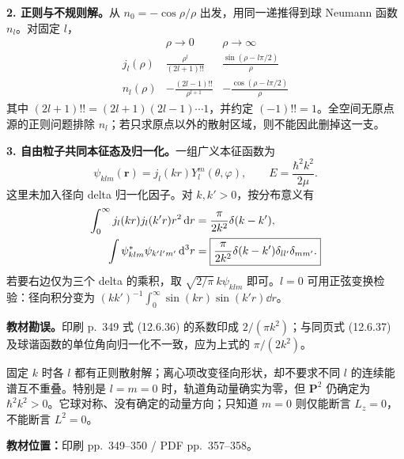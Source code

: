 \textbf{2. 正则与不规则解。}从 $n_0=-\cos\rho/\rho$ 出发，用同一递推得到球 Neumann 函数 $n_l$。对固定 $l$，
\begin{equation}
  \begin{array}{c|cc}
    &\rho\to0&\rho\to\infty\\ \hline
    j_l(\rho)&\displaystyle\frac{\rho^l}{(2l+1)!!}
       &\displaystyle\frac{\sin(\rho-l\pi/2)}\rho\\[6pt]
    n_l(\rho)&\displaystyle-\frac{(2l-1)!!}{\rho^{l+1}}
       &\displaystyle-\frac{\cos(\rho-l\pi/2)}\rho
  \end{array}
\end{equation}
其中 $(2l+1)!!=(2l+1)(2l-1)\cdots1$，并约定 $(-1)!!=1$。全空间无原点源的正则问题排除 $n_l$；若只求原点以外的散射区域，则不能因此删掉这一支。

\textbf{3. 自由粒子共同本征态及归一化。}一组广义本征函数为
\begin{equation}
  \boxed{\psi_{klm}(\mathbf r)=j_l(kr)Y_l^m(\theta,\varphi),\qquad
    E=\frac{\hbar^2k^2}{2\mu}.}
\end{equation}
这里未加入径向 delta 归一化因子。对 $k,k'>0$，按分布意义有
\begin{align}
  \int_0^\infty j_l(kr)j_l(k'r)r^2\mathop{}\!\mathrm{d} r
    &=\frac{\pi}{2k^2}\delta(k-k'),\notag\\
  \int\psi_{klm}^*\psi_{k'l'm'}\mathop{}\!\mathrm{d}^3r
    &=\boxed{\frac{\pi}{2k^2}\delta(k-k')\delta_{ll'}\delta_{mm'}.}
\end{align}
若要右边仅为三个 delta 的乘积，取 $\sqrt{2/\pi}\,k\psi_{klm}$ 即可。$l=0$ 可用正弦变换检验：径向积分变为 $(kk')^{-1}\int_0^\infty\sin(kr)\sin(k'r)\dd r$。

\textbf{教材勘误。}印刷 p.~349 式 (12.6.36) 的系数印成 $2/(\pi k^2)$；与同页式 (12.6.37) 及球谐函数的单位角向归一化不一致，应为上式的 $\pi/(2k^2)$。

固定 $k$ 时各 $l$ 都有正则散射解；离心项改变径向形状，却不要求不同 $l$ 的连续能谱互不重叠。特别是 $l=m=0$ 时，轨道角动量确实为零，但 $\mathbf P^2$ 仍确定为 $\hbar^2k^2>0$。它球对称、没有确定的动量方向；只知道 $m=0$ 则仅能断言 $L_z=0$，不能断言 $L^2=0$。

\textbf{教材位置：}印刷 pp.~349--350 / PDF pp.~357--358。

